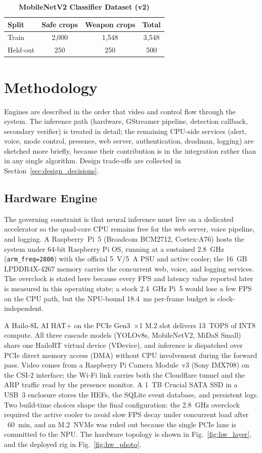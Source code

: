 \documentclass{ieeeaccess}
\begin{document}
\begin{table}[ht!]
\caption{\textbf{MobileNetV2 Classifier Dataset (v2)}}
\label{tab:mobilenet}
\setlength{\tabcolsep}{4pt}
\centering\small
\begin{tabular}{|l|c|c|c|}
\hline
\textbf{Split} & \textbf{Safe crops} & \textbf{Weapon crops} & \textbf{Total} \\
\hline
Train    & 2{,}000 & 1{,}548 & 3{,}548 \\
Held-out & 250     & 250     & 500 \\
\hline
\end{tabular}
\end{table}


\section{Methodology}
\label{sec:methodology}
Engines are described in the order that video and control flow through the system. The inference path (hardware, GStreamer pipeline, detection callback, secondary verifier) is treated in detail; the remaining CPU-side services (alert, voice, mode control, presence, web server, authentication, deadman, logging) are sketched more briefly, because their contribution is in the integration rather than in any single algorithm. Design trade-offs are collected in Section~\ref{sec:design_decisions}.

\subsection{Hardware Engine}
The governing constraint is that neural inference must live on a dedicated accelerator so the quad-core CPU remains free for the web server, voice pipeline, and logging. A Raspberry~Pi~5 (Broadcom BCM2712, Cortex-A76) hosts the system under 64-bit Raspberry Pi OS, running at a sustained 2.8~GHz (\texttt{arm\_freq=2800}) with the official 5~V/5~A PSU and active cooler; the 16~GB LPDDR4X-4267 memory carries the concurrent web, voice, and logging services. The overclock is stated here because every FPS and latency value reported later is measured in this operating state; a stock 2.4~GHz Pi~5 would lose a few FPS on the CPU path, but the NPU-bound 18.4~ms per-frame budget is clock-independent.

A Hailo-8L AI HAT+ on the PCIe Gen3~$\times$1 M.2 slot delivers 13~TOPS of INT8 compute. All three cascade models (YOLOv8s, MobileNetV2, MiDaS Small) share one HailoRT virtual device (VDevice), and inference is dispatched over PCIe direct memory access (DMA) without CPU involvement during the forward pass. Video comes from a Raspberry Pi Camera Module~v3 (Sony IMX708) on the CSI-2 interface; the Wi-Fi link carries both the Cloudflare tunnel and the ARP traffic read by the presence monitor. A 1~TB Crucial SATA SSD in a USB~3 enclosure stores the HEFs, the SQLite event database, and persistent logs. Two build-time choices shape the final configuration: the 2.8~GHz overclock required the active cooler to avoid slow FPS decay under concurrent load after ~60~min, and an M.2~NVMe was ruled out because the single PCIe lane is committed to the NPU. The hardware topology is shown in Fig.~\ref{fig:hw_layer}, and the deployed rig in Fig.~\ref{fig:hw_photo}.
\end{document}
